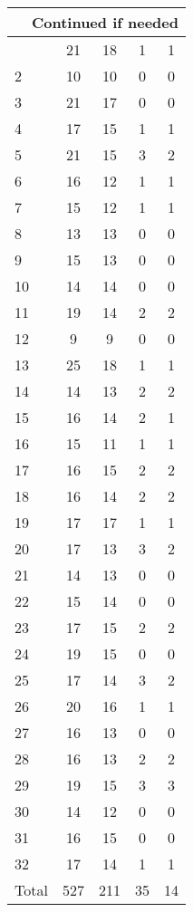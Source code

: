 \begin{center}
\begin{longtable}{l|c|c|c|c}
\hline \multicolumn{5}{|r|}{{Continued if needed}} \\ \hline
\endfoot 
1 & 21 & 18 & 1 & 1\\ \hline
2 & 10 & 10 & 0 & 0\\ \hline
3 & 21 & 17 & 0 & 0\\ \hline
4 & 17 & 15 & 1 & 1\\ \hline
5 & 21 & 15 & 3 & 2\\ \hline
6 & 16 & 12 & 1 & 1\\ \hline
7 & 15 & 12 & 1 & 1\\ \hline
8 & 13 & 13 & 0 & 0\\ \hline
9 & 15 & 13 & 0 & 0\\ \hline
10 & 14 & 14 & 0 & 0\\ \hline
11 & 19 & 14 & 2 & 2\\ \hline
12 & 9 & 9 & 0 & 0\\ \hline
13 & 25 & 18 & 1 & 1\\ \hline
14 & 14 & 13 & 2 & 2\\ \hline
15 & 16 & 14 & 2 & 1\\ \hline
16 & 15 & 11 & 1 & 1\\ \hline
17 & 16 & 15 & 2 & 2\\ \hline
18 & 16 & 14 & 2 & 2\\ \hline
19 & 17 & 17 & 1 & 1\\ \hline
20 & 17 & 13 & 3 & 2\\ \hline
21 & 14 & 13 & 0 & 0\\ \hline
22 & 15 & 14 & 0 & 0\\ \hline
23 & 17 & 15 & 2 & 2\\ \hline
24 & 19 & 15 & 0 & 0\\ \hline
25 & 17 & 14 & 3 & 2\\ \hline
26 & 20 & 16 & 1 & 1\\ \hline
27 & 16 & 13 & 0 & 0\\ \hline
28 & 16 & 13 & 2 & 2\\ \hline
29 & 19 & 15 & 3 & 3\\ \hline
30 & 14 & 12 & 0 & 0\\ \hline
31 & 16 & 15 & 0 & 0\\ \hline
32 & 17 & 14 & 1 & 1\\ \hline
\hline \hline
Total & 527 & 211 & 35 & 14




\end{longtable}
\end{center}

